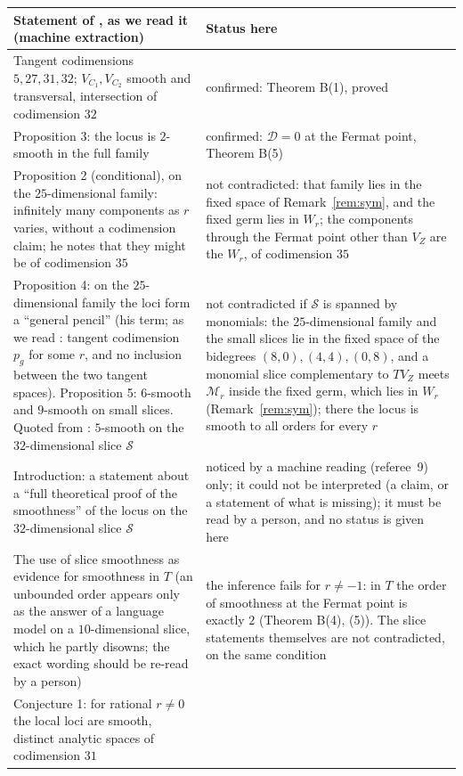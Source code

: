 \documentclass[11pt]{article}
\numberwithin{equation}{section}
\theoremstyle{remark}
\newcommand{\VZ}{V_Z}
\newcommand{\cD}{\mathcal{D}}
\newcommand{\cM}{\mathcal{M}}
\newcommand{\rg}{\raggedright}
\begin{document}
\begin{table}[!t]
\centering\footnotesize
\begin{tabular}{@{}p{}p{}@{}}
\toprule
Statement of \cite{Mo26}, as we read it (machine extraction) & Status here\\
\midrule
\rg Tangent codimensions $5,27,31,32$; $V_{C_1},V_{C_2}$ smooth and transversal, intersection of codimension $32$ &
 \rg confirmed: Theorem B(1), proved\tabularnewline
\rg Proposition 3: the locus is $2$-smooth in the full family & \rg confirmed: $\cD=0$ at the Fermat point,
 Theorem B(5)\tabularnewline
\rg Proposition 2 (conditional), on the $25$-dimensional family: infinitely many components as $r$ varies,
 without a codimension claim; he notes that they might be of codimension $35$ & \rg not contradicted: that
 family lies in the fixed space of Remark~\ref{rem:sym}, and the fixed germ lies in $W_r$; the components
 through the Fermat point other than $\VZ$ are the $W_r$, of codimension $35$\tabularnewline
\rg Proposition 4: on the $25$-dimensional family the loci form a ``general pencil'' (his term; as we read
 \cite{Mo21}: tangent codimension $p_g$ for some $r$, and no inclusion between the two tangent spaces).
 Proposition 5: $6$-smooth and $9$-smooth on small slices. Quoted from \cite[Thm~2]{Mo21}: $5$-smooth on the
 $32$-dimensional slice $\mathcal S$ & \rg not contradicted if $\mathcal S$ is spanned by monomials: the
 $25$-dimensional family and the small slices lie in the fixed space of the bidegrees $(8,0),(4,4),(0,8)$, and
 a monomial slice complementary to $T\VZ$ meets $\cM_r$ inside the fixed germ, which lies in $W_r$
 (Remark~\ref{rem:sym}); there the locus is smooth to all orders for every $r$\tabularnewline
\rg Introduction: a statement about a ``full theoretical proof of the smoothness'' of the locus on the
 $32$-dimensional slice $\mathcal S$ & \rg noticed by a machine reading (referee~9) only; it could not be
 interpreted (a claim, or a statement of what is missing); it must be read by a person, and no status is given
 here\tabularnewline
\rg The use of slice smoothness as evidence for smoothness in $T$ (an unbounded order appears only as the answer
 of a language model on a $10$-dimensional slice, which he partly disowns; the exact wording should be re-read by a
 person) & \rg the inference fails for $r\ne-1$: in $T$ the order of smoothness at the Fermat point is exactly
 $2$ (Theorem B(4), (5)). The slice statements themselves are not contradicted, on the same
 condition\tabularnewline
\rg Conjecture 1: for rational $r\neq0$ the local loci are smooth, distinct analytic spaces of codimension $31$

\end{tabular}
\end{table}
\end{document}
